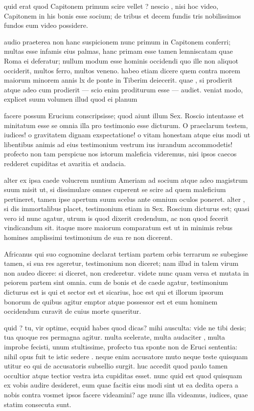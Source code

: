  quid erat quod Capitonem primum scire vellet ? nescio , nisi hoc video, Capitonem in his bonis esse socium; de tribus et decem fundis tris nobilissimos fundos eum video possidere.

 audio praeterea non hanc suspicionem nunc primum in Capitonem conferri; multas esse infamis eius palmas, hanc primam esse tamen lemniscatam quae Roma ei deferatur; nullum modum esse hominis occidendi quo ille non aliquot occiderit, multos ferro, multos veneno. habeo etiam dicere quem contra morem maiorum minorem annis lx de ponte in Tiberim deiecerit. quae , si prodierit atque adeo cum prodierit — scio enim proditurum esse — audiet. veniat modo, explicet suum volumen illud quod ei planum

 facere possum Erucium conscripsisse; quod aiunt illum Sex. Roscio intentasse et minitatum esse se omnia illa pro testimonio esse dicturum. O praeclarum testem, iudices! o gravitatem dignam exspectatione! o vitam honestam atque eius modi ut libentibus animis ad eius testimonium vestrum ius iurandum accommodetis! profecto non tam perspicue nos istorum maleficia videremus, nisi ipsos caecos redderet cupiditas et avaritia et audacia.

 alter ex ipsa caede volucrem nuntium Ameriam ad socium atque adeo magistrum suum misit ut, si dissimulare omnes cuperent se scire ad quem maleficium pertineret, tamen ipse apertum suum scelus ante omnium oculos poneret. alter , si dis immortalibus placet, testimonium etiam in Sex. Roscium dicturus est; quasi vero id nunc agatur, utrum is quod dixerit credendum, ac non quod fecerit vindicandum sit. itaque more maiorum comparatum est ut in minimis rebus homines amplissimi testimonium de sua re non dicerent.

 Africanus qui suo cognomine declarat tertiam partem orbis terrarum se subegisse tamen, si sua res ageretur, testimonium non diceret; nam illud in talem virum non audeo dicere: si diceret, non crederetur. videte nunc quam versa et mutata in peiorem partem sint omnia. cum de bonis et de caede agatur, testimonium dicturus est is qui et sector est et sicarius, hoc est qui et illorum ipsorum bonorum de quibus agitur emptor atque possessor est et eum hominem occidendum curavit de cuius morte quaeritur.

 quid ? tu, vir optime, ecquid habes quod dicas? mihi ausculta: vide ne tibi desis; tua quoque res permagna agitur. multa scelerate, multa audaciter , multa improbe fecisti, unum stultissime, profecto tua sponte non de Eruci sententia: nihil opus fuit te istic sedere . neque enim accusatore muto neque teste quisquam utitur eo qui de accusatoris subsellio surgit. huc accedit quod paulo tamen occultior atque tectior vestra ista cupiditas esset. nunc quid est quod quisquam ex vobis audire desideret, eum quae facitis eius modi sint ut ea dedita opera a nobis contra vosmet ipsos facere videamini? age nunc illa videamus, iudices, quae statim consecuta sunt.

